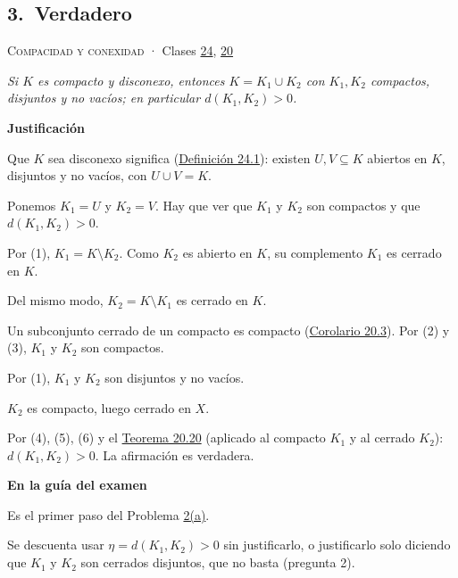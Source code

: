 \documentclass[11pt,a4paper]{article}
\newcommand{\bloque}[1]{\par\smallskip\noindent\textbf{\color{acento}#1}\par}
\begin{document}
\subsection*{\hypertarget{r-3}{}3.\ \textcolor{ok}{Verdadero}}
{\small \textsc{Compacidad y conexidad} · Clases \href{https://decostruttivismo.github.io/MAT2514-repaso/pdf/MAT2514_apuntes_completos.pdf\#nameddest=section.24}{24}, \href{https://decostruttivismo.github.io/MAT2514-repaso/pdf/MAT2514_apuntes_completos.pdf\#nameddest=section.20}{20}}\par
\emph{Si $K$ es compacto y disconexo, entonces $K=K_1\cup K_2$ con $K_1,K_2$ compactos, disjuntos y no vacíos; en particular $d(K_1,K_2)\gt 0$.}
\bloque{Justificación}
\begin{pasos}
\item[(1)] Que $K$ sea disconexo significa (\href{https://decostruttivismo.github.io/MAT2514-repaso/pdf/MAT2514_apuntes_completos.pdf\#nameddest=teorema.24.1}{Definición 24.1}): existen $U,V\subseteq K$ abiertos en $K$, disjuntos y no vacíos, con $U\cup V=K$.
\item[] Ponemos $K_1=U$ y $K_2=V$. Hay que ver que $K_1$ y $K_2$ son compactos y que $d(K_1,K_2)\gt 0$.
\item[(2)] Por (1), $K_1=K\setminus K_2$. Como $K_2$ es abierto en $K$, su complemento $K_1$ es cerrado en $K$.
\item[(3)] Del mismo modo, $K_2=K\setminus K_1$ es cerrado en $K$.
\item[(4)] Un subconjunto cerrado de un compacto es compacto (\href{https://decostruttivismo.github.io/MAT2514-repaso/pdf/MAT2514_apuntes_completos.pdf\#nameddest=teorema.20.3}{Corolario 20.3}). Por (2) y (3), $K_1$ y $K_2$ son compactos.
\item[(5)] Por (1), $K_1$ y $K_2$ son disjuntos y no vacíos.
\item[(6)] $K_2$ es compacto, luego cerrado en $X$.
\item[] Por (4), (5), (6) y el \href{https://decostruttivismo.github.io/MAT2514-repaso/pdf/MAT2514_apuntes_completos.pdf\#nameddest=teorema.20.20}{Teorema 20.20} (aplicado al compacto $K_1$ y al cerrado $K_2$): $d(K_1,K_2)\gt 0$. La afirmación es verdadera.
\end{pasos}
\bloque{En la guía del examen}
\begin{pasos}
\item[] Es el primer paso del Problema \hyperlink{prob-2}{2(a)}.
\item[] Se descuenta usar $\eta=d(K_1,K_2)\gt 0$ sin justificarlo, o justificarlo solo diciendo que $K_1$ y $K_2$ son cerrados disjuntos, que no basta (pregunta 2).
\end{pasos}
\end{document}
